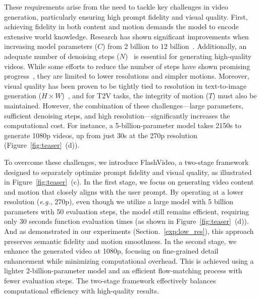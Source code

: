 These requirements arise from the need to tackle key challenges in video generation, particularly ensuring high prompt fidelity and visual quality. First, achieving fidelity in both content and motion demands the model to encode extensive world knowledge. Research has shown significant improvements when increasing model parameters ($C$) from 2 billion to 12 billion~\citep{cogvideox, kong2024hunyuanvideo}. Additionally, an adequate number of denoising steps ($N$)~\citep{moviegen, kong2024hunyuanvideo, cogvideox} is essential for generating high-quality videos. While some efforts to reduce the number of steps have shown promising progress~\citep{ding2024dollar}, they are limited to lower resolutions and simpler motions. Moreover, visual quality has been proven to be tightly tied to resolution in text-to-image generation  ($H \times W$)~\citep{blattmann2023align, chen2025pixart, ren2024ultrapixel}, and for T2V tasks, the integrity of motion ($T$) must also be maintained. However, the combination of these challenges—large parameters, sufficient denoising steps, and high resolution—significantly increases the computational cost. For instance, a 5-billion-parameter model takes 2150s to generate 1080p videos, up from just 30s at the 270p resolution (Figure~\ref{fig:teaser}~(d)). 

To overcome these challenges, we introduce FlashVideo, a two-stage framework designed to separately optimize prompt fidelity and visual quality, as illustrated in Figure~\ref{fig:teaser}~(c). In the first stage, we focus on generating video content and motion that closely aligns with the user prompt. By operating at a lower resolution (\textit{e.g.}, 270p), even though we utilize a large model with 5 billion parameters with 50 evaluation steps, the model still remains efficient, requiring only 30 seconds function evaluation times (as shown in Figure~\ref{fig:teaser}~(d)). And as demonstrated in our experiments (Section.~\ref{exp:low_res}), this approach preserves semantic fidelity and motion smoothness. In the second stage, we enhance the generated video at 1080p, focusing on fine-grained detail enhancement while minimizing computational overhead. This is achieved using a lighter 2-billion-parameter model and an efficient flow-matching process with fewer evaluation steps. The two-stage framework effectively balances computational efficiency with high-quality results. 

